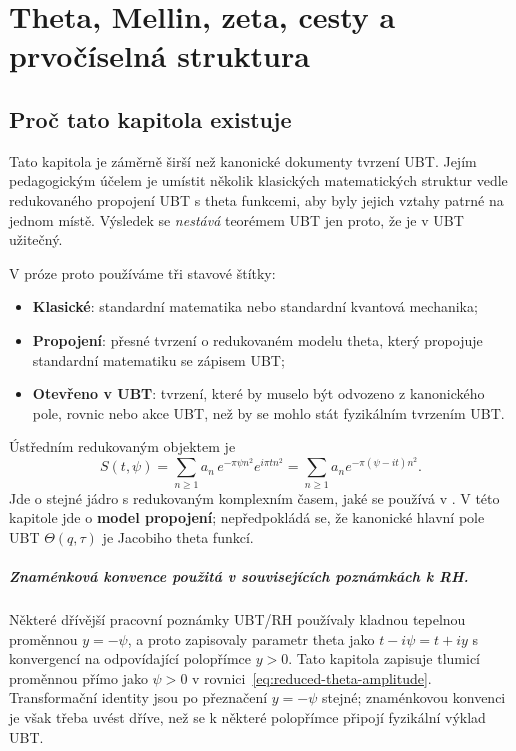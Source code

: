 
\chapter{Theta, Mellin, zeta, cesty a prvočíselná struktura}
\label{ch:theta-mellin-feynman}

\section{Proč tato kapitola existuje}

Tato kapitola je záměrně širší než kanonické dokumenty tvrzení UBT. Jejím
pedagogickým účelem je umístit několik klasických matematických struktur vedle
redukovaného propojení UBT s theta funkcemi, aby byly jejich vztahy patrné na
jednom místě. Výsledek se \emph{nestává} teorémem UBT jen proto, že je v UBT
užitečný.

V próze proto používáme tři stavové štítky:
\begin{itemize}
  \item\textbf{Klasické}: standardní matematika nebo standardní kvantová mechanika;
  \item\textbf{Propojení}: přesné tvrzení o redukovaném modelu theta, který
        propojuje standardní matematiku se zápisem UBT;
  \item\textbf{Otevřeno v UBT}: tvrzení, které by muselo být odvozeno z kanonického
        pole, rovnic nebo akce UBT, než by se mohlo stát fyzikálním tvrzením UBT.
\end{itemize}

Ústředním redukovaným objektem je
\begin{equation}
  S(t,\psi)
  = \sum_{n\ge 1} a_n\,e^{-\pi\psi n^2}e^{i\pi t n^2}
  = \sum_{n\ge1}a_n e^{-\pi(\psi-it)n^2}.
  \label{eq:reduced-theta-amplitude}
\end{equation}
Jde o stejné jádro s redukovaným komplexním časem, jaké se používá v
. V této kapitole jde o
\textbf{model propojení}; nepředpokládá se, že kanonické hlavní pole UBT
$\Theta(q,\tau)$ je Jacobiho theta funkcí.

\paragraph{Znaménková konvence použitá v souvisejících poznámkách k RH.}
Některé dřívější pracovní poznámky UBT/RH používaly kladnou tepelnou proměnnou
$y=-\psi$, a proto zapisovaly parametr theta jako $t-i\psi=t+iy$ s konvergencí
na odpovídající polopřímce $y>0$. Tato kapitola zapisuje tlumicí proměnnou přímo
jako $\psi>0$ v rovnici~\eqref{eq:reduced-theta-amplitude}. Transformační
identity jsou po přeznačení $y=-\psi$ stejné; znaménkovou konvenci je však třeba
uvést dříve, než se k některé polopřímce připojí fyzikální výklad UBT.

